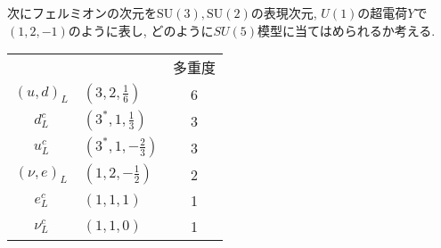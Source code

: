 次にフェルミオンの次元を$\mathrm{SU}(3), \mathrm{SU}(2)$の表現次元, $U(1)$の超電荷$Y$で $(1, 2, -1)$のように表し, どのように$SU(5)$模型に当てはめられるか考える.
\begin{center}
\begin{tabular}{clc}
             &                         & 多重度 \\
  $(u, d)_L$ & $(3  , 2, \frac{1}{6})$ &      6 \\
    $d_L^c $ & $(3^*, 1, \frac{1}{3})$ &      3 \\ 
    $u_L^c $ & $(3^*, 1,-\frac{2}{3})$ &      3 \\ 
$(\nu, e)_L$ & $(1  , 2,-\frac{1}{2})$ &      2 \\ 
     $e_L^c$ & $(1  , 1,           1)$ &      1 \\ 
   $\nu_L^c$ & $(1  , 1,           0)$ &      1 \\ 
\end{tabular}
\end{center}

